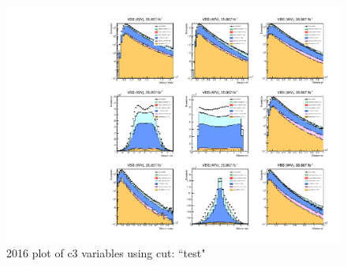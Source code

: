 \documentclass{article}
\begin{document}
                    \begin{figure}[H]
                        \centering
                        \caption{2016 plot of c3 variables using cut: ``test"}
                        \includegraphics[width=\textwidth]{2016/c3_2016_test.pdf}
                    \end{figure}    
\end{document}
